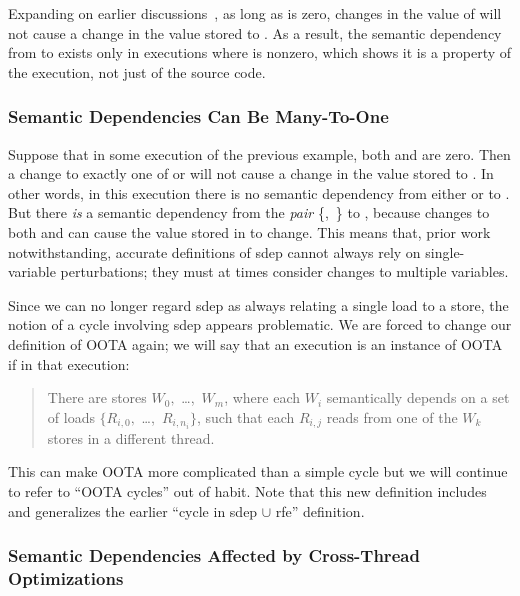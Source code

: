 Expanding on earlier discussions~\cite{Boehm:2014:OGA:2618128.2618134},
as long as  is zero, changes in the
value of  will not cause a change in the value stored to .
As a result, the semantic dependency from  to  exists only
in executions where  is nonzero,
which shows it is a property of the execution, not just of the source code.

\subsubsection{Semantic Dependencies Can Be Many-To-One}
\label{sec:Semantic Dependencies Can Be Many-To-One}

Suppose that in some execution of the previous example,
both  and  are zero.
Then a change to exactly one of  or 
will not cause a change in the value stored to .
In other words, in this execution there is no semantic dependency
from either  or  to .
But there \emph{is} a semantic dependency from the \emph{pair}
\{,~\} to ,
because changes to both  and 
can cause the value stored in  to change.
This means that, prior work~\cite{PaulEMcKenney2016OOTA}
notwithstanding, accurate definitions of sdep cannot always rely on
single-variable perturbations;
they must at times consider changes to multiple variables.

Since we can no longer regard sdep as always relating a single load to a store,
the notion of a cycle involving sdep appears problematic.
We are forced to change our definition of OOTA again;
we will say that an execution is an instance of OOTA if in that execution:
\begin{quote}
	There are stores $W_0,$ \ldots,~$W_m$,
	where each $W_i$ semantically depends on a set of loads
	$\{R_{i,0},$ \ldots,~$R_{i,n_i}\}$,
	such that each $R_{i,j}$ reads from one of the $W_k$
	stores in a different thread.
\end{quote}
This can make OOTA more complicated than a simple cycle but
we will continue to refer to ``OOTA cycles'' out of habit.
Note that this new definition includes and generalizes the earlier
``cycle in sdep $\cup$ rfe'' definition.

\subsubsection{Semantic Dependencies Affected by Cross-Thread Optimizations}
\label{sec:Semantic Dependencies Affected by Cross-Thread Optimizations}

